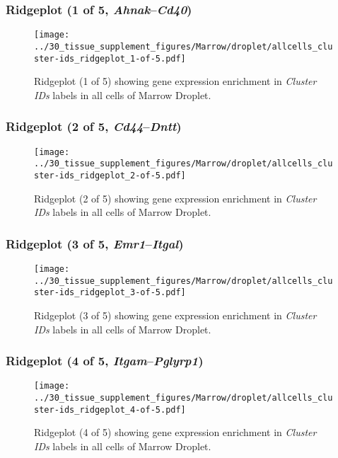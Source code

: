 \clearpage

\subsubsection{Ridgeplot (1 of 5, \emph{Ahnak}--\emph{Cd40})}
\begin{figure}[h]
\centering
\texttt{[image: ../30\_tissue\_supplement\_figures/Marrow/droplet/allcells\_cluster-ids\_ridgeplot\_1-of-5.pdf]}

\caption{ Ridgeplot (1 of 5)  showing gene expression enrichment in \emph{Cluster IDs} labels in all cells of Marrow Droplet. }
\end{figure}


\clearpage

\subsubsection{Ridgeplot (2 of 5, \emph{Cd44}--\emph{Dntt})}
\begin{figure}[h]
\centering
\texttt{[image: ../30\_tissue\_supplement\_figures/Marrow/droplet/allcells\_cluster-ids\_ridgeplot\_2-of-5.pdf]}

\caption{ Ridgeplot (2 of 5)  showing gene expression enrichment in \emph{Cluster IDs} labels in all cells of Marrow Droplet. }
\end{figure}


\clearpage

\subsubsection{Ridgeplot (3 of 5, \emph{Emr1}--\emph{Itgal})}
\begin{figure}[h]
\centering
\texttt{[image: ../30\_tissue\_supplement\_figures/Marrow/droplet/allcells\_cluster-ids\_ridgeplot\_3-of-5.pdf]}

\caption{ Ridgeplot (3 of 5)  showing gene expression enrichment in \emph{Cluster IDs} labels in all cells of Marrow Droplet. }
\end{figure}


\clearpage

\subsubsection{Ridgeplot (4 of 5, \emph{Itgam}--\emph{Pglyrp1})}
\begin{figure}[h]
\centering
\texttt{[image: ../30\_tissue\_supplement\_figures/Marrow/droplet/allcells\_cluster-ids\_ridgeplot\_4-of-5.pdf]}

\caption{ Ridgeplot (4 of 5)  showing gene expression enrichment in \emph{Cluster IDs} labels in all cells of Marrow Droplet. }
\end{figure}


